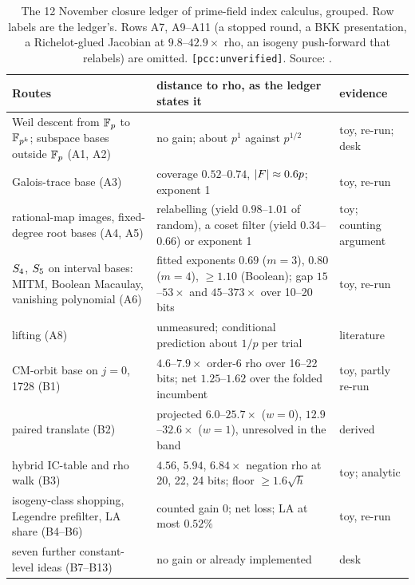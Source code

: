 \begin{table}[t]
\centering\footnotesize
\begin{tabularx}{\linewidth}{@{}>{\raggedright}p{3.6cm}>{\raggedright}X>{\raggedright\arraybackslash}p{2.2cm}@{}}
\toprule
Routes & distance to rho, as the ledger states it & evidence \\
\midrule
Weil descent from $\mathbb{F}_p$ to $\mathbb{F}_{p^k}$; subspace bases outside $\mathbb{F}_p$ (A1, A2) & no gain; about $p^1$ against $p^{1/2}$ & toy, re-run; desk \\
Galois-trace base (A3) & coverage $0.52$--$0.74$, $\lvert F \rvert\approx0.6p$; exponent 1 & toy, re-run \\
rational-map images, fixed-degree root bases (A4, A5) & relabelling (yield $0.98$--$1.01$ of random), a coset filter (yield $0.34$--$0.66$) or exponent 1 & toy; counting argument \\
$S_{4}$, $S_{5}$ on interval bases: MITM, Boolean Macaulay, vanishing polynomial (A6) & fitted exponents $0.69$ ($m=3$), $0.80$ ($m=4$), $\ge1.10$ (Boolean); gap $15$--$53\times$ and $45$--$373\times$ over 10--20 bits & toy, re-run \\
lifting (A8) & unmeasured; conditional prediction about $1/p$ per trial & literature \\
CM-orbit base on $j=0$, 1728 (B1) & $4.6$--$7.9\times$ order-6 rho over 16--22 bits; net $1.25$--$1.62$ over the folded incumbent & toy, partly re-run \\
paired translate (B2) & projected $6.0$--$25.7\times$ ($w=0$), $12.9$--$32.6\times$ ($w=1$), unresolved in the band & derived \\
hybrid IC-table and rho walk (B3) & $4.56$, $5.94$, $6.84\times$ negation rho at 20, 22, 24 bits; floor $\ge1.6\sqrt h$ & toy; analytic \\
isogeny-class shopping, Legendre prefilter, LA share (B4--B6) & counted gain 0; net loss; LA at most $0.52\%$ & toy, re-run \\
seven further constant-level ideas (B7--B13) & no gain or already implemented & desk \\
\bottomrule
\end{tabularx}
\caption[]{The 12 November closure ledger of prime-field index calculus,
grouped. Row labels are the ledger's. Rows A7, A9--A11 (a stopped round, a
BKK presentation, a Richelot-glued Jacobian at $9.8$--$42.9\times$ rho, an
isogeny push-forward that relabels) are omitted. \texttt{[pcc:unverified]}.
Source: .}
\label{tab:pa-closure}
\end{table}

